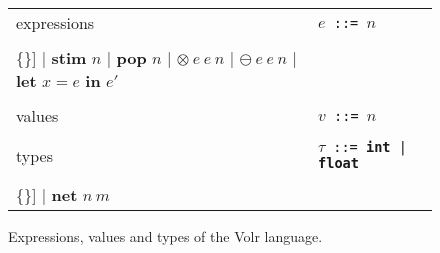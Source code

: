 \begin{figure}
  \begin{tabular}[t]{l l}
    expressions 
    & \texttt{$e$ ::= $n$} \\
    & \begin{minipage}{0.6\textwidth}
      \begin{Verbatim}[mathescape,commandchars=\\\{\}]
    | \textbf{stim} $n$
    | \textbf{pop} $n$
    | $\otimes\ e\ e\ n$
    | $\ominus\ e\ e\ n$
    | \textbf{let} $x = e$ \textbf{in} $e'$
      \end{Verbatim} 
    \end{minipage} \\

    & \\ %
    
    values
    & \texttt{$v$ ::= $n$} \\
    
    & \\ %

    types
    & \texttt{$\tau$ ::= \textbf{int} | \textbf{float}} \\
    & \begin{minipage}{0.6\textwidth}
      \begin{Verbatim}[mathescape,commandchars=\\\{\}]
    | \textbf{net} $n\ m$
      \end{Verbatim}
    \end{minipage}
  \end{tabular}

  \caption{Expressions, values and types of the Volr language.}
  \label{fig:volr-expr}
\end{figure}
